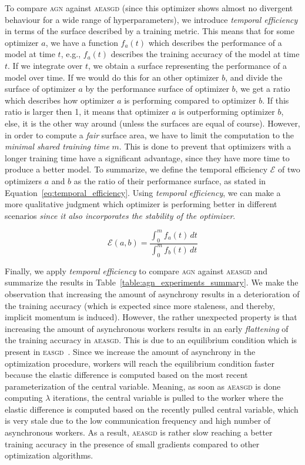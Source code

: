 \documentclass[wcp]{jmlr}
\newcommand\ddfrac[2]{\frac{\displaystyle #1}{\displaystyle #2}}
\begin{document}
To compare \textsc{agn} against \textsc{aeasgd} (since this optimizer shows almost no divergent behaviour for a wide range of hyperparameters), we introduce \emph{temporal efficiency} in terms of the surface described by a training metric. This means that for some optimizer $a$, we have a function $f_a(t)$ which describes the performance of a model at time $t$, e.g., $f_a(t)$ describes the training accuracy of the model at time $t$. If we integrate over $t$, we obtain a surface representing the performance of a model over time. If we would do this for an other optimizer $b$, and divide the surface of optimizer $a$ by the performance surface of optimizer $b$, we get a ratio which describes how optimizer $a$ is performing compared to optimizer $b$. If this ratio is larger then 1, it means that optimizer $a$ is outperforming optimizer $b$, else, it is the other way around (unless the surfaces are equal of course). However, in order to compute a \emph{fair} surface area, we have to limit the computation to the \emph{minimal shared training time} $m$. This is done to prevent that optimizers with a longer training time have a significant advantage, since they have more time to produce a better model. To summarize, we define the temporal efficiency $\mathcal{E}$ of two optimizers $a$ and $b$ as the ratio of their performance surface, as stated in Equation~\ref{eq:temporal_efficiency}. Using \emph{temporal efficiency}, we can make a more qualitative judgment which optimizer is performing better in different scenarios \emph{since it also incorporates the stability of the optimizer}.

\begin{equation}
  \label{eq:temporal_efficiency}
  \mathcal{E}(a,b) = \ddfrac{\int_0^m f_a(t) \,dt}{\int_0^m f_b(t) \,dt}
\end{equation}

Finally, we apply \emph{temporal efficiency} to compare \textsc{agn} against \textsc{aeasgd} and summarize the results in Table~\ref{table:agn_experiments_summary}. We make the observation that increasing the amount of asynchrony results in a deterioration of the training accuracy (which is expected since more staleness, and thereby, implicit momentum is induced). However, the rather unexpected property is that increasing the amount of asynchronous workers results in an early \emph{flattening} of the training accuracy in \textsc{aeasgd}. This is due to an equilibrium condition which is present in \textsc{easgd}~\cite{Hermans:2276711}. Since we increase the amount of asynchrony in the optimization procedure, workers will reach the equilibrium condition faster because the elastic difference is computed based on the most recent parameterization of the central variable. Meaning, as soon as \textsc{aeasgd} is done computing $\lambda$ iterations, the central variable is pulled to the worker where the elastic difference is computed based on the recently pulled central variable, which is very stale due to the low communication frequency and high number of asynchronous workers. As a result, \textsc{aeasgd} is rather slow reaching a better training accuracy in the presence of small gradients compared to other optimization algorithms.
\end{document}
